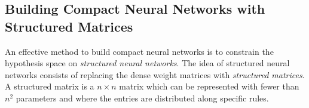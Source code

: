 \subsection{Building Compact Neural Networks with Structured Matrices}
\label{subsection:ch3-building_compact_neural_networks_with_structured_matrices}









An effective method to build compact neural networks is to constrain the hypothesis space on \emph{structured neural networks}. 
The idea of structured neural networks consists of replacing the dense weight matrices with \emph{structured matrices}.
A structured matrix is a $n \times n$ matrix which can be represented with fewer than $n^2$ parameters and where the entries are distributed along specific rules.



